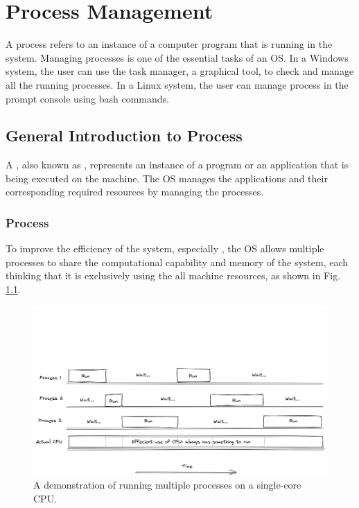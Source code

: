 \chapter{Process Management} \label{ch:pm}

A process refers to an instance of a computer program that is running in the system. Managing processes is one of the essential tasks of an OS. In a Windows system, the user can use the task manager, a graphical tool, to check and manage all the running processes. In a Linux system, the user can manage process in the prompt console using bash commands.

\section{General Introduction to Process}

A , also known as , represents an instance of a program or an application that is being executed on the machine. The OS manages the applications and their corresponding required resources by managing the processes.
\subsection{Process}

To improve the efficiency of the system, especially , the OS allows multiple processes to share the computational capability and memory of the system, each thinking that it is exclusively using the all machine resources, as shown in Fig. \ref{ch:pm:fig:processflow}.

\begin{figure}[!htb]
	\centering
	\includegraphics[width=350pt]{chapters/part-1/figures/processflow.png}
	\caption{A demonstration of running multiple processes on a single-core CPU.} \label{ch:pm:fig:processflow}
\end{figure}

